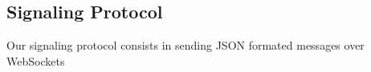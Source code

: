 \subsection{Signaling Protocol}

Our signaling protocol consists in sending JSON formated messages over WebSockets